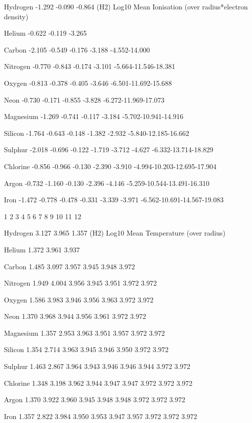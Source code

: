{ Hydrogen   -1.292 -0.090 -0.864 (H2)         Log10 Mean Ionisation (over
radius*electron density)

 Helium     -0.622 -0.119 -3.265

 Carbon     -2.105 -0.549 -0.176 -3.188 -4.552-14.000

 Nitrogen   -0.770 -0.843 -0.174 -3.101 -5.664-11.546-18.381

 Oxygen     -0.813 -0.378 -0.405 -3.646 -6.501-11.692-15.688

 Neon       -0.730 -0.171 -0.855 -3.828 -6.272-11.969-17.073

 Magnesium  -1.269 -0.741 -0.117 -3.184 -5.702-10.941-14.916

 Silicon    -1.764 -0.643 -0.148 -1.382 -2.932 -5.840-12.185-16.662

 Sulphur    -2.018 -0.696 -0.122 -1.719 -3.712 -4.627 -6.332-13.714-18.829

 Chlorine   -0.856 -0.966 -0.130 -2.390 -3.910 -4.994-10.203-12.695-17.904

 Argon      -0.732 -1.160 -0.130 -2.396 -4.146 -5.259-10.544-13.491-16.310

 Iron       -1.472 -0.778 -0.478 -0.331 -3.339 -3.971
-6.562-10.691-14.567-19.083


               1      2      3      4      5      6      7      8      9
10     11     12    

 Hydrogen    3.127  3.965  1.357 (H2)                 Log10 Mean Temperature
(over radius)

 Helium      1.372  3.961  3.937

 Carbon      1.485  3.097  3.957  3.945  3.948  3.972

 Nitrogen    1.949  4.004  3.956  3.945  3.951  3.972  3.972

 Oxygen      1.586  3.983  3.946  3.956  3.963  3.972  3.972

 Neon        1.370  3.968  3.944  3.956  3.961  3.972  3.972

 Magnesium   1.357  2.953  3.963  3.951  3.957  3.972  3.972

 Silicon     1.354  2.714  3.963  3.945  3.946  3.950  3.972  3.972

 Sulphur     1.463  2.867  3.964  3.943  3.946  3.946  3.944  3.972  3.972

 Chlorine    1.348  3.198  3.962  3.944  3.947  3.947  3.972  3.972  3.972

 Argon       1.370  3.922  3.960  3.945  3.948  3.948  3.972  3.972  3.972

 Iron        1.357  2.822  3.984  3.950  3.953  3.947  3.957  3.972  3.972
3.972

}
